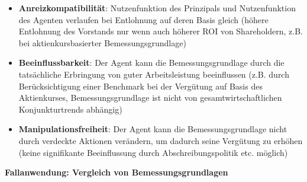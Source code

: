 \documentclass[
]{article}
\providecommand{\tightlist}{%
  \setlength{\itemsep}{0pt}\setlength{\parskip}{0pt}}
\begin{document}
\begin{itemize}
\tightlist
\item
  \textbf{Anreizkompatibilität}: Nutzenfunktion des Prinzipals und
  Nutzenfunktion des Agenten verlaufen bei Entlohnung auf deren Basis
  gleich (höhere Entlohnung des Vorstands nur wenn auch höherer ROI von
  Shareholdern, z.B. bei aktienkursbasierter Bemessungsgrundlage)
\item
  \textbf{Beeinflussbarkeit}: Der Agent kann die Bemessungsgrundlage
  durch die tatsächliche Erbringung von guter Arbeitsleistung
  beeinflussen (z.B. durch Berücksichtigung einer Benchmark bei der
  Vergütung auf Basis des Aktienkurses, Bemessungsgrundlage ist nicht
  von gesamtwirtschaftlichen Konjunkturtrends abhängig)
\item
  \textbf{Manipulationsfreiheit}: Der Agent kann die Bemessungsgrundlage
  nicht durch verdeckte Aktionen verändern, um dadurch seine Vergütung
  zu erhöhen (keine signifikante Beeinflussung durch
  Abschreibungspolitik etc. möglich)
\end{itemize}

\textbf{Fallanwendung: Vergleich von Bemessungsgrundlagen}
\end{document}

